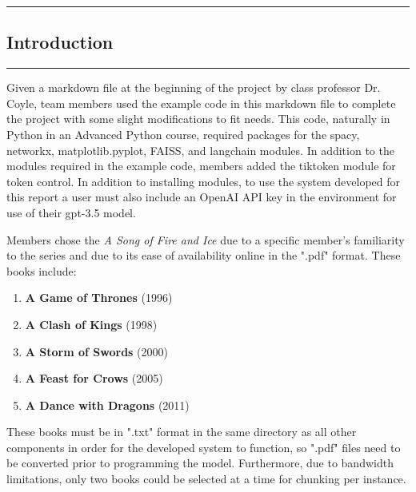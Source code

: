 \newpage
{\color{gray}\hrule}
\begin{center}
\section{Introduction}
\bigskip
\end{center}
{\color{gray}\hrule}

Given a markdown file at the beginning of the project by class professor Dr. Coyle, team members used the example code in this markdown file to complete the project with some slight modifications to fit needs. This code, naturally in Python in an Advanced Python course, required packages for the spacy, networkx, matplotlib.pyplot, FAISS, and langchain modules. In addition to the modules required in the example code, members added the tiktoken module for token control. In addition to installing modules, to use the system developed for this report a user must also include an OpenAI API key in the environment for use of their gpt-3.5 model.\par
Members chose the \textit{A Song of Fire and Ice} due to a specific member's familiarity to the series and due to its ease of availability online in the ".pdf" format. These books include: \bigskip

\begin{enumerate}[label=\arabic*.]
    \item \textbf{A Game of Thrones} (1996)
    \item \textbf{A Clash of Kings} (1998)
    \item \textbf{A Storm of Swords} (2000)
    \item \textbf{A Feast for Crows} (2005)
    \item \textbf{A Dance with Dragons} (2011)
\end{enumerate}
\bigskip

These books must be in ".txt" format in the same directory as all other components in order for the developed system to function, so ".pdf" files need to be converted prior to programming the model. Furthermore, due to bandwidth limitations, only two books could be selected at a time for chunking per instance.
\bigskip